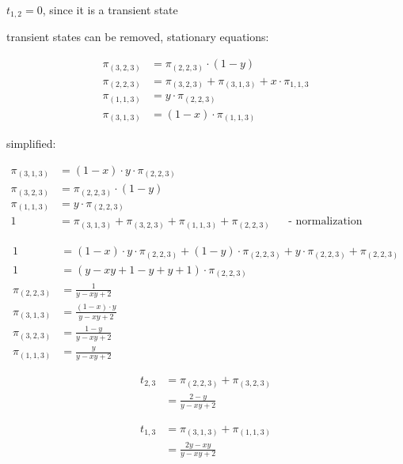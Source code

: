 $t_{{1,2}}=0$, since it is a transient state

transient states can be removed, stationary equations:

\begin{align*}
\pi _{{\left(3,2,3\right)}}&=\pi _{{\left(2,2,3\right)}}\cdot \left(1-y\right)\\
\pi _{{\left(2,2,3\right)}}&=\pi _{{\left(3,2,3\right)}}+\pi _{{\left(3,1,3\right)}}+x\cdot \pi _{{1,1,3}}\\
\pi _{{\left(1,1,3\right)}}&=y\cdot \pi _{{\left(2,2,3\right)}}\\
\pi _{{\left(3,1,3\right)}}&=\left(1-x\right)\cdot \pi _{{\left(1,1,3\right)}}
\end{align*}

simplified:

\begin{align*}
\pi _{{\left(3,1,3\right)}}&=\left(1-x\right)\cdot y\cdot \pi _{{\left(2,2,3\right)}}\\
\pi _{{\left(3,2,3\right)}}&=\pi _{{\left(2,2,3\right)}}\cdot \left(1-y\right)\\
\pi _{{\left(1,1,3\right)}}&=y\cdot \pi _{{\left(2,2,3\right)}}\\
1&=\pi _{{\left(3,1,3\right)}}+\pi _{{\left(3,2,3\right)}}+\pi _{{\left(1,1,3\right)}}+\pi _{{\left(2,2,3\right)}}&& \text{-  normalization condition -}
\end{align*}

\begin{align*}
1 &= \left(1-x\right)\cdot y\cdot \pi _{{\left(2,2,3\right)}}+\left(1-y\right)\cdot \pi _{{\left(2,2,3\right)}}+y\cdot \pi _{{\left(2,2,3\right)}}+\pi _{{\left(2,2,3\right)}}\\
1 &= \left(y-xy+1-y+y+1\right)\cdot \pi _{{\left(2,2,3\right)}}\\
\pi _{{\left(2,2,3\right)}}&=\frac{1}{y-xy+2}\\
\pi _{{\left(3,1,3\right)}}&=\frac{\left(1-x\right)\cdot y}{y-xy+2}\\
\pi _{{\left(3,2,3\right)}}&=\frac{1-y}{y-xy+2}\\
\pi _{{\left(1,1,3\right)}}&=\frac{y}{y-xy+2}
\end{align*}

\begin{align*}
t_{{2,3}}&=\pi _{{\left(2,2,3\right)}}+\pi _{{\left(3,2,3\right)}}\\
&=\frac{2-y}{y-xy+2}
\end{align*}

\begin{align*}
t_{{1,3}}&=\pi _{{\left(3,1,3\right)}}+\pi _{{\left(1,1,3\right)}}\\
&=\frac{2y-xy}{y-xy+2}
\end{align*}

